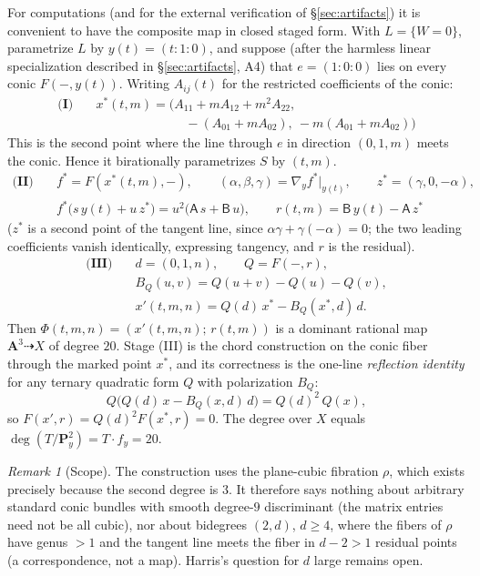 \documentclass[11pt]{amsart}
\theoremstyle{definition}
\theoremstyle{remark}
\newtheorem{remark}[theorem]{Remark}
\newcommand{\PP}{\mathbf{P}}
\begin{document}
For computations (and for the external verification of
\S\ref{sec:artifacts}) it is convenient to have the composite map in
closed staged form.  With $L=\{W=0\}$, parametrize $L$ by
$y(t)=(t{:}1{:}0)$, and suppose (after the harmless linear specialization
described in \S\ref{sec:artifacts}, A4) that $e=(1{:}0{:}0)$ lies on every
conic $F(-,y(t))$.  Writing $A_{ij}(t)$ for the restricted coefficients of
the conic:
\begin{align*}
\textbf{(I)}\quad
&x^*(t,m)=\bigl(A_{11}+mA_{12}+m^2A_{22},\\
&\hspace{7em}-(A_{01}+mA_{02}),\ -m(A_{01}+mA_{02})\bigr)
\end{align*}
This is the second point where the line through $e$ in direction $(0,1,m)$
meets the conic.  Hence it birationally parametrizes $S$ by $(t,m)$.
\begin{align*}
\textbf{(II)}\quad
&f^*=F(x^*(t,m),-),\qquad
(\alpha,\beta,\gamma)=\nabla_y f^*\big|_{y(t)},\qquad
z^*=(\gamma,0,-\alpha),\\
&f^*\bigl(s\,y(t)+u\,z^*\bigr)=u^2\bigl(\mathsf A\,s+\mathsf B\,u\bigr),
\qquad
r(t,m)=\mathsf B\,y(t)-\mathsf A\,z^*
\end{align*}
($z^*$ is a second point of the tangent line, since
$\alpha\gamma+\gamma(-\alpha)=0$; the two leading coefficients vanish
identically, expressing tangency, and $r$ is the residual).
\begin{align*}
\textbf{(III)}\quad
&d=(0,1,n),\qquad Q=F(-,r),\\
&B_Q(u,v)=Q(u+v)-Q(u)-Q(v),\\
&x'(t,m,n)=Q(d)\,x^*-B_Q(x^*,d)\,d .
\end{align*}
Then $\Phi(t,m,n)=(x'(t,m,n);\,r(t,m))$ is a dominant rational map
$\mathbf A^3\dashrightarrow X$ of degree $20$.  Stage (III) is the chord
construction on the conic fiber through the marked point $x^*$, and its
correctness is the one-line \emph{reflection identity} for any ternary
quadratic form $Q$ with polarization $B_Q$:
\[
Q\bigl(Q(d)\,x-B_Q(x,d)\,d\bigr)=Q(d)^2\,Q(x),
\]
so $F(x',r)=Q(d)^2F(x^*,r)=0$.
The degree over $X$ equals $\deg(T/\PP^2_y)=T\cdot f_y=20$.

\begin{remark}[Scope]\label{rem:scope}
The construction uses the plane-cubic fibration $\rho$, which exists
precisely because the second degree is $3$.  It therefore says nothing
about arbitrary standard conic bundles with smooth degree-$9$ discriminant
(the matrix entries need not be all cubic), nor about bidegrees $(2,d)$,
$d\ge4$, where the fibers of $\rho$ have genus $>1$ and the tangent line
meets the fiber in $d-2>1$ residual points (a correspondence, not a map).
Harris's question for $d$ large \cite[p.~24]{Harris} remains open.
\end{remark}
\end{document}
